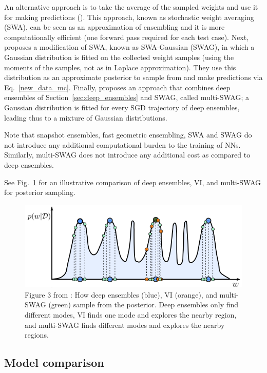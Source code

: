 An alternative approach is to take the average of the sampled weights and use it for making predictions (\cite{izmailov2019averaging}). 
This approach, known as stochastic weight averaging (SWA), can be seen as an approximation of ensembling and it is more computationally efficient (one forward pass required for each test case).
Next, \textcite{maddox2019simple} proposes a modification of SWA, known as SWA-Gaussian (SWAG), in which a Gaussian distribution is fitted on the collected weight samples (using the moments of the samples, not as in Laplace approximation). 
They use this distribution as an approximate posterior to sample from and make predictions via Eq.~\eqref{new_data_mc}.
Finally, \textcite{wilson2020bayesian} proposes an approach that combines deep ensembles of Section~\ref{sec:deep_ensembles} and SWAG, called multi-SWAG; a Gaussian distribution is fitted for every SGD trajectory of deep ensembles, leading thus to a mixture of Gaussian distributions.
 
Note that snapshot ensembles, fast geometric ensembling, SWA and SWAG do not introduce any additional computational burden to the training of NNs.
Similarly, multi-SWAG does not introduce any additional cost as compared to deep ensembles.

See Fig.~\ref{fig:multiswag} for an illustrative comparison of deep ensembles, VI, and multi-SWAG for posterior sampling.
\begin{figure}
	\centering
	\includegraphics[width=0.7\linewidth]{./Figures/multiswag.png}
	\caption{Figure 3 from \textcite{wilson2020bayesian}: How deep ensembles (blue), VI (orange), and multi-SWAG (green) sample from the posterior.
	Deep ensembles only find different modes, VI finds one mode and explores the nearby region, and multi-SWAG finds different modes and explores the nearby regions.}
	\label{fig:multiswag}
\end{figure} 


\subsection{Model comparison}

